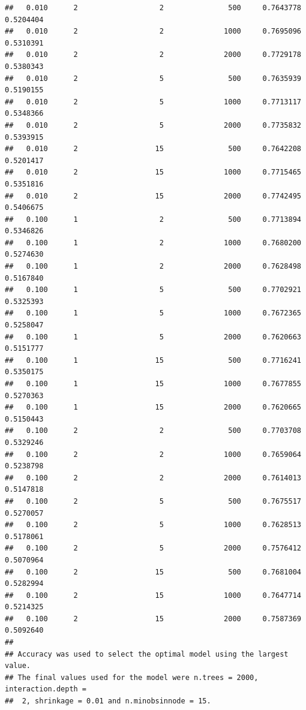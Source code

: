 \documentclass[]{article}
\begin{document}
\begin{lstlisting}
##   0.010      2                   2               500     0.7643778  0.5204404
##   0.010      2                   2              1000     0.7695096  0.5310391
##   0.010      2                   2              2000     0.7729178  0.5380343
##   0.010      2                   5               500     0.7635939  0.5190155
##   0.010      2                   5              1000     0.7713117  0.5348366
##   0.010      2                   5              2000     0.7735832  0.5393915
##   0.010      2                  15               500     0.7642208  0.5201417
##   0.010      2                  15              1000     0.7715465  0.5351816
##   0.010      2                  15              2000     0.7742495  0.5406675
##   0.100      1                   2               500     0.7713894  0.5346826
##   0.100      1                   2              1000     0.7680200  0.5274630
##   0.100      1                   2              2000     0.7628498  0.5167840
##   0.100      1                   5               500     0.7702921  0.5325393
##   0.100      1                   5              1000     0.7672365  0.5258047
##   0.100      1                   5              2000     0.7620663  0.5151777
##   0.100      1                  15               500     0.7716241  0.5350175
##   0.100      1                  15              1000     0.7677855  0.5270363
##   0.100      1                  15              2000     0.7620665  0.5150443
##   0.100      2                   2               500     0.7703708  0.5329246
##   0.100      2                   2              1000     0.7659064  0.5238798
##   0.100      2                   2              2000     0.7614013  0.5147818
##   0.100      2                   5               500     0.7675517  0.5270057
##   0.100      2                   5              1000     0.7628513  0.5178061
##   0.100      2                   5              2000     0.7576412  0.5070964
##   0.100      2                  15               500     0.7681004  0.5282994
##   0.100      2                  15              1000     0.7647714  0.5214325
##   0.100      2                  15              2000     0.7587369  0.5092640
## 
## Accuracy was used to select the optimal model using the largest value.
## The final values used for the model were n.trees = 2000, interaction.depth =
##  2, shrinkage = 0.01 and n.minobsinnode = 15.
\end{lstlisting}
\end{document}
